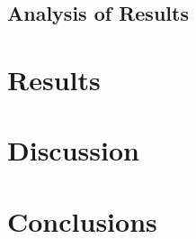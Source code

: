 \subsection{Analysis of Results} \label{sec:Exp2:Analysis}




\section{Results} \label{sec:Exp2:Results}


\section{Discussion} \label{sec:Exp2:Discussion}


\section{Conclusions} \label{sec:Exp2:Conclusions}

